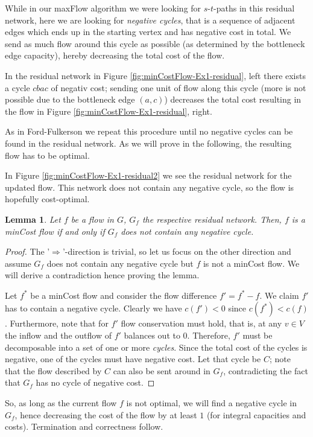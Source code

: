 \documentclass{article}
\newtheorem{lemma}{Lemma}
\begin{document}
While in our maxFlow algorithm we were looking for $s$-$t$-paths in this residual network, here we are looking for \emph{negative cycles}, that is a sequence of adjacent edges which ends up in the starting vertex and has negative cost in total. We send as much flow around this cycle as possible (as determined by the bottleneck edge capacity), hereby decreasing the total cost of the flow.

In the residual network in Figure \ref{fig:minCostFlow-Ex1-residual}, left there exists a cycle $cbac$ of negativ cost; sending one unit of flow along this cycle (more is not possible due to the bottleneck edge $(a,c)$) decreases the total cost resulting in the flow in Figure \ref{fig:minCostFlow-Ex1-residual}, right.


As in Ford-Fulkerson we repeat this procedure until no negative cycles can be found in the residual network. As we will prove in the following, the resulting flow has to be optimal.

In Figure \ref{fig:minCostFlow-Ex1-residual2} we see the residual network for the updated flow. This network does not contain any negative cycle, so the flow is hopefully cost-optimal.

\begin{lemma}
Let $f$ be a flow in $G$, $G_f$ the respective residual network. Then, $f$ is a minCost flow if and only if $G_f$ does not contain any negative cycle.
\end{lemma}
\begin{proof}
The '$\Rightarrow$'-direction is trivial, so let us focus on the other direction and assume $G_f$ does not contain any negative cycle but $f$ is not a minCost flow. We will derive a contradiction hence proving the lemma.

Let $f^*$ be a minCost flow and consider the flow difference $f'=f^*-f$. We claim $f'$ has to contain a negative cycle. Clearly we have $c(f')<0$ since $c(f^*)<c(f)$. Furthermore, note that for $f'$ flow conservation must hold, that is, at any $v\in V$ the inflow and the outflow of $f'$ balances out to $0$. Therefore, $f'$ must be decomposable into a set of one or more \emph{cycles}. Since the total cost of the cycles is negative, one of the cycles must have negative cost. Let that cycle be $C$; note that the flow described by $C$ can also be sent around in $G_f$, contradicting the fact that $G_f$ has no cycle of negative cost.
\end{proof}

So, as long as the current flow $f$ is not optimal, we will find a negative cycle in $G_f$, hence decreasing the cost of the flow by at least $1$ (for integral capacities and costs). Termination and correctness follow.
\end{document}

